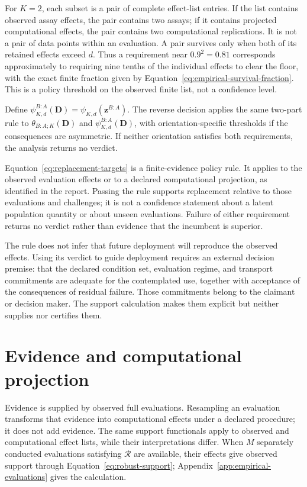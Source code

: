 \documentclass[11pt]{article}
\newcommand{\Regime}{\mathcal{R}}
\theoremstyle{remark}
\begin{document}
For $K=2$, each subset is a pair of complete effect-list entries. If the list
contains observed assay effects, the pair contains two assays; if it contains
projected computational effects, the pair contains two computational
replications. It is not a pair of data points within an evaluation. A pair
survives only when both of its retained effects exceed $d$. Thus a requirement
near $0.9^2=0.81$ corresponds approximately to requiring nine tenths of the
individual effects to clear the floor, with the exact finite fraction given by
Equation~\eqref{eq:empirical-survival-fraction}. This is a policy threshold on
the observed finite list, not a confidence level.

Define $\psi^{B:A}_{K,d}(\mathbf D)=\psi_{K,d}(\mathbf z^{B:A})$. The reverse decision applies the same two-part rule to $\theta_{B:A;K}(\mathbf D)$ and $\psi^{B:A}_{K,d}(\mathbf D)$, with orientation-specific thresholds if the consequences are asymmetric. If neither orientation satisfies both requirements, the analysis returns no verdict.

Equation~\eqref{eq:replacement-targets} is a finite-evidence policy rule. It
applies to the observed evaluation effects or to a declared computational
projection, as identified in the report. Passing the rule supports replacement
relative to those evaluations and challenges; it is not a confidence statement
about a latent population quantity or about unseen evaluations. Failure of
either requirement returns no verdict rather than evidence that the incumbent
is superior.

The rule does not infer that future deployment will reproduce the observed
effects. Using its verdict to guide deployment requires an external decision
premise: that the declared condition set, evaluation regime, and transport
commitments are adequate for the contemplated use, together with acceptance of
the consequences of residual failure. Those commitments belong to the claimant
or decision maker. The support calculation makes them explicit but neither
supplies nor certifies them.

\section{Evidence and computational projection}
\label{sec:evidence}

Evidence is supplied by observed full evaluations. Resampling an evaluation
transforms that evidence into computational effects under a declared procedure;
it does not add evidence. The same support functionals apply to observed and
computational effect lists, while their interpretations differ. When $M$
separately conducted evaluations satisfying $\Regime$ are available, their
effects give observed support through Equation~\eqref{eq:robust-support};
Appendix~\ref{app:empirical-evaluations} gives the calculation.
\end{document}
